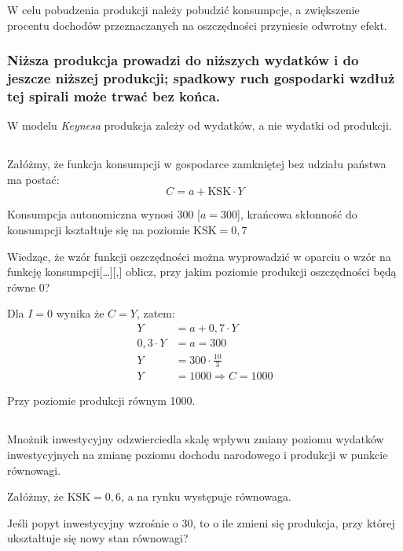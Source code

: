 \documentclass[a4paper,12pt]{article}
\begin{document}
W celu pobudzenia produkcji należy pobudzić konsumpcje, a zwiększenie procentu dochodów przeznaczanych na oszczędności przyniesie odwrotny efekt.

\subsubsection*{Niższa produkcja prowadzi do niższych wydatków i do jeszcze niższej produkcji; spadkowy ruch gospodarki wzdłuż tej spirali może trwać bez końca.}

W modelu \emph{Keynesa} produkcja zależy od wydatków, a nie wydatki od produkcji.

\subsection{}

Załóżmy, że funkcja konsumpcji w gospodarce zamkniętej bez udziału państwa ma postać:
\[C = a + \text{KSK} \cdot Y\]

Konsumpcja autonomiczna wynosi 300 [$a = 300$], krańcowa skłonność do konsumpcji kształtuje się na poziomie $\text{KSK} = 0,7$

Wiedząc, że wzór funkcji oszczędności można wyprowadzić w oparciu o wzór na funkcję konsumpcji[\dots][,] oblicz, przy jakim poziomie produkcji oszczędności będą równe 0?

\vspace{1cm}
Dla $I = 0$ wynika że $C = Y$, zatem:
\begin{align*}
	Y           & = a + 0,7 \cdot Y           \\
	0,3 \cdot Y & = a = 300                   \\
	Y           & = 300 \cdot \frac{10}{3}    \\
	Y           & = 1000 \Rightarrow C = 1000
\end{align*}

Przy poziomie produkcji równym 1000.

\subsection{}

Mnożnik inwestycyjny odzwierciedla skalę wpływu zmiany poziomu wydatków inwestycyjnych na zmianę poziomu dochodu narodowego i produkcji w punkcie równowagi.

Załóżmy, że $\text{KSK} = 0,6$, a na rynku występuje równowaga.

Jeśli popyt inwestycyjny wzrośnie o 30, to o ile zmieni się produkcja, przy której ukształtuje się nowy stan równowagi?
\end{document}
